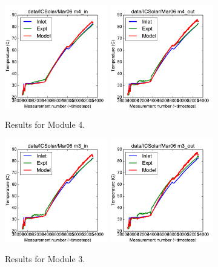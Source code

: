 \documentclass{article}
\begin{document}
\clearpage
\begin{figure}[!ht]
\centering
\includegraphics[width=0.4\textwidth]{../../data/ICSolar/images/Mar06_m4_in_unsteady.pdf}\hspace{0.05\textwidth}
\includegraphics[width=0.4\textwidth]{../../data/ICSolar/images/Mar06_m4_out_unsteady.pdf}\hspace{0.05\textwidth}\\
\caption{Results for Module 4.}\end{figure}
\begin{figure}[!ht]
\centering
\includegraphics[width=0.4\textwidth]{../../data/ICSolar/images/Mar06_m3_in_unsteady.pdf}\hspace{0.05\textwidth}
\includegraphics[width=0.4\textwidth]{../../data/ICSolar/images/Mar06_m3_out_unsteady.pdf}\hspace{0.05\textwidth}\\
\caption{Results for Module 3.}\end{figure}
\end{document}
